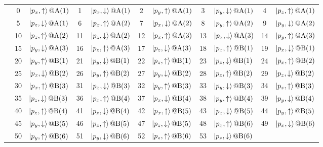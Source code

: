 \documentclass[fleqn,10pt,landscape]{jsarticle}
\begin{document}
\begin{longtable}[l]{c|cl|cl|cl|cl|cl}
 & 0 & $\ket{p_{x},\uparrow}@{\rm A}(1)$ & 1 & $\ket{p_{x},\downarrow}@{\rm A}(1)$ & 2 & $\ket{p_{y},\uparrow}@{\rm A}(1)$ & 3 & $\ket{p_{y},\downarrow}@{\rm A}(1)$ & 4 & $\ket{p_{z},\uparrow}@{\rm A}(1)$ \\
& 5 & $\ket{p_{z},\downarrow}@{\rm A}(1)$ & 6 & $\ket{p_{x},\uparrow}@{\rm A}(2)$ & 7 & $\ket{p_{x},\downarrow}@{\rm A}(2)$ & 8 & $\ket{p_{y},\uparrow}@{\rm A}(2)$ & 9 & $\ket{p_{y},\downarrow}@{\rm A}(2)$ \\
& 10 & $\ket{p_{z},\uparrow}@{\rm A}(2)$ & 11 & $\ket{p_{z},\downarrow}@{\rm A}(2)$ & 12 & $\ket{p_{x},\uparrow}@{\rm A}(3)$ & 13 & $\ket{p_{x},\downarrow}@{\rm A}(3)$ & 14 & $\ket{p_{y},\uparrow}@{\rm A}(3)$ \\
& 15 & $\ket{p_{y},\downarrow}@{\rm A}(3)$ & 16 & $\ket{p_{z},\uparrow}@{\rm A}(3)$ & 17 & $\ket{p_{z},\downarrow}@{\rm A}(3)$ & 18 & $\ket{p_{x},\uparrow}@{\rm B}(1)$ & 19 & $\ket{p_{x},\downarrow}@{\rm B}(1)$ \\
& 20 & $\ket{p_{y},\uparrow}@{\rm B}(1)$ & 21 & $\ket{p_{y},\downarrow}@{\rm B}(1)$ & 22 & $\ket{p_{z},\uparrow}@{\rm B}(1)$ & 23 & $\ket{p_{z},\downarrow}@{\rm B}(1)$ & 24 & $\ket{p_{x},\uparrow}@{\rm B}(2)$ \\
& 25 & $\ket{p_{x},\downarrow}@{\rm B}(2)$ & 26 & $\ket{p_{y},\uparrow}@{\rm B}(2)$ & 27 & $\ket{p_{y},\downarrow}@{\rm B}(2)$ & 28 & $\ket{p_{z},\uparrow}@{\rm B}(2)$ & 29 & $\ket{p_{z},\downarrow}@{\rm B}(2)$ \\
& 30 & $\ket{p_{x},\uparrow}@{\rm B}(3)$ & 31 & $\ket{p_{x},\downarrow}@{\rm B}(3)$ & 32 & $\ket{p_{y},\uparrow}@{\rm B}(3)$ & 33 & $\ket{p_{y},\downarrow}@{\rm B}(3)$ & 34 & $\ket{p_{z},\uparrow}@{\rm B}(3)$ \\
& 35 & $\ket{p_{z},\downarrow}@{\rm B}(3)$ & 36 & $\ket{p_{x},\uparrow}@{\rm B}(4)$ & 37 & $\ket{p_{x},\downarrow}@{\rm B}(4)$ & 38 & $\ket{p_{y},\uparrow}@{\rm B}(4)$ & 39 & $\ket{p_{y},\downarrow}@{\rm B}(4)$ \\
& 40 & $\ket{p_{z},\uparrow}@{\rm B}(4)$ & 41 & $\ket{p_{z},\downarrow}@{\rm B}(4)$ & 42 & $\ket{p_{x},\uparrow}@{\rm B}(5)$ & 43 & $\ket{p_{x},\downarrow}@{\rm B}(5)$ & 44 & $\ket{p_{y},\uparrow}@{\rm B}(5)$ \\
& 45 & $\ket{p_{y},\downarrow}@{\rm B}(5)$ & 46 & $\ket{p_{z},\uparrow}@{\rm B}(5)$ & 47 & $\ket{p_{z},\downarrow}@{\rm B}(5)$ & 48 & $\ket{p_{x},\uparrow}@{\rm B}(6)$ & 49 & $\ket{p_{x},\downarrow}@{\rm B}(6)$ \\
& 50 & $\ket{p_{y},\uparrow}@{\rm B}(6)$ & 51 & $\ket{p_{y},\downarrow}@{\rm B}(6)$ & 52 & $\ket{p_{z},\uparrow}@{\rm B}(6)$ & 53 & $\ket{p_{z},\downarrow}@{\rm B}(6)$ &  &  \\
\end{longtable}
\end{document}
